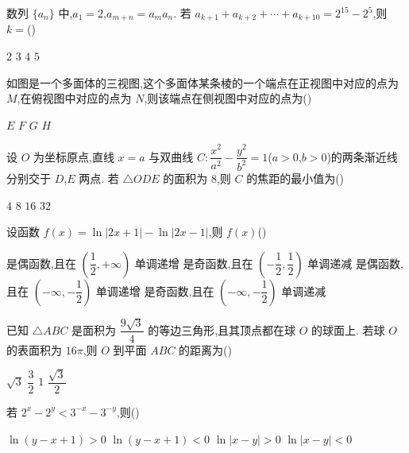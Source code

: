 \begin{problem}
数列 \(\{a_n\}\) 中,\(a_1=2\),\(a_{m+n}=a_m a_n\). 若 \(a_{k+1}+a_{k+2}+\cdots+a_{k+10}=2^{15}-2^5\),则 \(k=\)(\quad)

\choices
    {\(2\)}
    {\(3\)}
    {\(4\)}
    {\(5\)}
\end{problem}

\begin{problem}
如图是一个多面体的三视图,这个多面体某条棱的一个端点在正视图中对应的点为 \(M\),在俯视图中对应的点为 \(N\),则该端点在侧视图中对应的点为(\quad)


\choices
    {\(E\)}
    {\(F\)}
    {\(G\)}
    {\(H\)}
\end{problem}

\begin{problem}
设 \(O\) 为坐标原点,直线 \(x=a\) 与双曲线 \(C:\dfrac{x^2}{a^2}-\dfrac{y^2}{b^2}=1\)(\(a>0\),\(b>0\))的两条渐近线分别交于 \(D\),\(E\) 两点. 若 \(\triangle ODE\) 的面积为 \(8\),则 \(C\) 的焦距的最小值为(\quad)

\choices
    {\(4\)}
    {\(8\)}
    {\(16\)}
    {\(32\)}
\end{problem}

\begin{problem}
设函数 \(f(x)=\ln |2x+1|-\ln |2x-1|\),则 \(f(x)\)(\quad)

\choices
    {是偶函数,且在 \(\left( \dfrac{1}{2},+\infty \right)\) 单调递增}
    {是奇函数,且在 \(\left( -\dfrac{1}{2},\dfrac{1}{2} \right)\) 单调递减}
    {是偶函数,且在 \(\left( -\infty,-\dfrac{1}{2} \right)\) 单调递增}
    {是奇函数,且在 \(\left( -\infty,-\dfrac{1}{2} \right)\) 单调递减}
\end{problem}

\begin{problem}
已知 \(\triangle ABC\) 是面积为 \(\dfrac{9\sqrt3}{4}\) 的等边三角形,且其顶点都在球 \(O\) 的球面上. 若球 \(O\) 的表面积为 \(16\pi\),则 \(O\) 到平面 \(ABC\) 的距离为(\quad)

\choices
    {\(\sqrt3\)}
    {\(\dfrac{3}{2}\)}
    {\(1\)}
    {\(\dfrac{\sqrt3}{2}\)}
\end{problem}

\begin{problem}
若 \(2^x-2^y<3^{-x}-3^{-y}\),则(\quad)

\choices
    {\(\ln \left( y-x+1 \right)>0\)}
    {\(\ln \left( y-x+1 \right)<0\)}
    {\(\ln \left| x-y \right|>0\)}
    {\(\ln \left| x-y \right|<0\)}
\end{problem}

